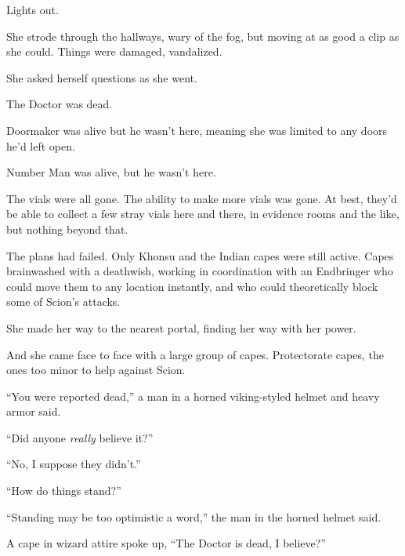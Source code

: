 Lights out.



She strode through the hallways, wary of the fog, but moving at as good a clip as she could.  Things were damaged, vandalized.



She asked herself questions as she went.



The Doctor was dead.



Doormaker was alive but he wasn't here, meaning she was limited to any doors he'd left open.



Number Man was alive, but he wasn't here.



The vials were all gone.  The ability to make more vials was gone.  At best, they'd be able to collect a few stray vials here and there, in evidence rooms and the like, but nothing beyond that.



The plans had failed.  Only Khonsu and the Indian capes were still active.  Capes brainwashed with a deathwish, working in coordination with an Endbringer who could move them to any location instantly, and who could theoretically block some of Scion's attacks.



She made her way to the nearest portal, finding her way with her power.



And she came face to face with a large group of capes.  Protectorate capes, the ones too minor to help against Scion.



``You were reported dead,'' a man in a horned viking-styled helmet and heavy armor said.



``Did anyone \emph{really }believe it?''



``No, I suppose they didn't.''



``How do things stand?''



``Standing may be too optimistic a word,'' the man in the horned helmet said.



A cape in wizard attire spoke up, ``The Doctor is dead, I believe?''



